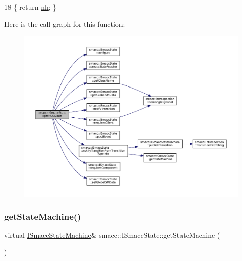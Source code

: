 \begin{DoxyCode}
18 \{ \textcolor{keywordflow}{return} \hyperlink{classsmacc_1_1ISmaccState_a13fe6e6abfdb87996402189d44b78494}{nh}; \}
\end{DoxyCode}
Here is the call graph for this function\+:
\nopagebreak
\begin{figure}[H]
\begin{center}
\leavevmode
\includegraphics[width=350pt]{classsmacc_1_1ISmaccState_a5d3f13b9d7ae7fdcf9da21c4ed935706_cgraph}
\end{center}
\end{figure}
\mbox{\label{classsmacc_1_1ISmaccState_a562bb3f9a3ac16b8be71e4794c9e7523}} 
\subsubsection{\texorpdfstring{get\+State\+Machine()}{getStateMachine()}}
{\footnotesize\ttfamily virtual \hyperlink{classsmacc_1_1ISmaccStateMachine}{I\+Smacc\+State\+Machine}\& smacc\+::\+I\+Smacc\+State\+::get\+State\+Machine (\begin{DoxyParamCaption}{ }\end{DoxyParamCaption})\hspace{0.3cm}{\ttfamily [pure virtual]}}



